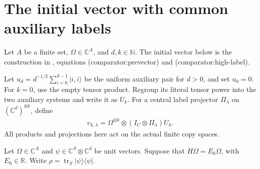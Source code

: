\section{The initial vector with common auxiliary labels}
\label{sec:replica_prevector}

Let $A$ be a finite set, $\Omega\in\mathbb C^A$, and $d,k\in\mathbb N$.
The initial vector below is the construction in
\cite[Section~7]{OpenAI2026AreaLaw}, equations
\textup{(comparator:prevector)} and \textup{(comparator:high-label)}.

\begin{definition}
    \label{def:replica_prevector}
    \leanok
    Let $u_d=d^{-1/2}\sum_{i=0}^{d-1}|i,i\rangle$ be the uniform auxiliary pair
    for $d>0$, and set $u_0=0$. For $k=0$, use the empty tensor product.
    Regroup its literal tensor power into the two auxiliary systems and write it
    as $U_k$. For a central label projector $\Pi_\lambda$ on
    $(\mathbb C^d)^{\otimes k}$, define
    \begin{align}
        v_{k,\lambda}=\Omega^{\otimes k}\otimes
        (I_C\otimes\Pi_\lambda)U_k.
    \end{align}
    All products and projections here act on the actual finite copy spaces.
\end{definition}


Let $\Omega\in\mathbb C^A$ and
$\psi\in\mathbb C^S\otimes\mathbb C^d$ be unit vectors. Suppose that
$H\Omega=E_0\Omega$, with $E_0\in\mathbb R$.
Write $\rho=\operatorname{tr}_S|\psi\rangle\langle\psi|$.

